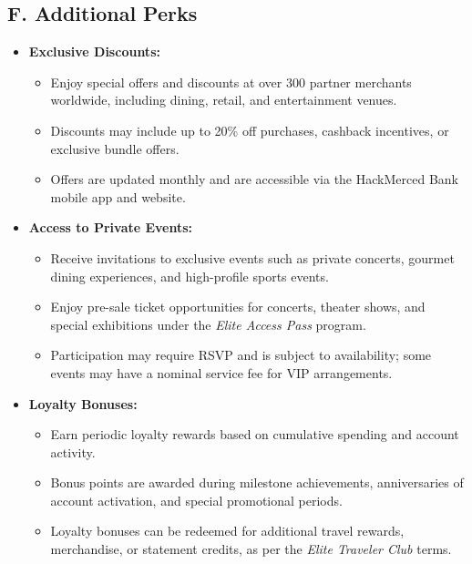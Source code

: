 \documentclass[12pt,a4paper]{article}
\begin{document}
\subsection*{F. Additional Perks}
\begin{itemize}
    \item \textbf{Exclusive Discounts:}
    \begin{itemize}
        \item Enjoy special offers and discounts at over 300 partner merchants worldwide, including dining, retail, and entertainment venues.
        \item Discounts may include up to 20\% off purchases, cashback incentives, or exclusive bundle offers.
        \item Offers are updated monthly and are accessible via the HackMerced Bank mobile app and website.
    \end{itemize}
    
    \item \textbf{Access to Private Events:}
    \begin{itemize}
        \item Receive invitations to exclusive events such as private concerts, gourmet dining experiences, and high-profile sports events.
        \item Enjoy pre-sale ticket opportunities for concerts, theater shows, and special exhibitions under the \textit{Elite Access Pass} program.
        \item Participation may require RSVP and is subject to availability; some events may have a nominal service fee for VIP arrangements.
    \end{itemize}
    
    \item \textbf{Loyalty Bonuses:}
    \begin{itemize}
        \item Earn periodic loyalty rewards based on cumulative spending and account activity.
        \item Bonus points are awarded during milestone achievements, anniversaries of account activation, and special promotional periods.
        \item Loyalty bonuses can be redeemed for additional travel rewards, merchandise, or statement credits, as per the \textit{Elite Traveler Club} terms.
    \end{itemize}
\end{itemize}

\newpage
\end{document}
